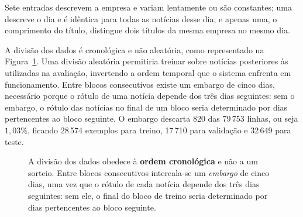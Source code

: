 Sete entradas descrevem a empresa e variam lentamente ou são constantes; uma descreve o dia e é
idêntica para todas as notícias desse dia; e apenas uma, o comprimento do título, distingue dois
títulos da mesma empresa no mesmo dia.

A divisão dos dados é cronológica e não aleatória, como representado na
Figura~\ref{fig:met_divisao}. Uma divisão aleatória permitiria treinar sobre notícias posteriores
às utilizadas na avaliação, invertendo a ordem temporal que o sistema enfrenta em funcionamento.
Entre blocos consecutivos existe um embargo de cinco dias, necessário porque o rótulo de uma
notícia depende dos três dias seguintes: sem o embargo, o rótulo das notícias no final de um bloco
seria determinado por dias pertencentes ao bloco seguinte. O embargo descarta 820 das 79\,753
linhas, ou seja $1{,}03\%$, ficando 28\,574 exemplos para treino, 17\,710 para validação e 32\,649
para teste.

\begin{figure}[htbp]
\centering
{}
\caption[Divisão temporal com embargo]{A divisão dos dados obedece à \textbf{ordem cronológica} e
não a um sorteio. Entre blocos consecutivos intercala-se um \emph{embargo} de cinco dias, uma vez
que o rótulo de cada notícia depende dos três dias seguintes: sem ele, o final do bloco de treino
seria determinado por dias pertencentes ao bloco seguinte.}
\label{fig:met_divisao}
\end{figure}

